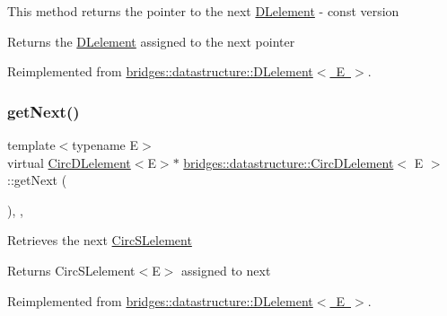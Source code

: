 This method returns the pointer to the next \mbox{\hyperlink{classbridges_1_1datastructure_1_1_d_lelement}{D\+Lelement}} -\/ const version \begin{DoxyReturn}{Returns}
the \mbox{\hyperlink{classbridges_1_1datastructure_1_1_d_lelement}{D\+Lelement}} assigned to the next pointer 
\end{DoxyReturn}


Reimplemented from \mbox{\hyperlink{classbridges_1_1datastructure_1_1_d_lelement_a8599e5be5fc1771d4e8a40f6de67b4a7}{bridges\+::datastructure\+::\+D\+Lelement$<$ E $>$}}.

\mbox{\label{classbridges_1_1datastructure_1_1_circ_d_lelement_a80681d0382643a6df21da1bec4067004}} 
\subsubsection{\texorpdfstring{get\+Next()}{getNext()}\hspace{0.1cm}{\footnotesize\ttfamily [2/2]}}
{\footnotesize\ttfamily template$<$typename E$>$ \\
virtual \mbox{\hyperlink{classbridges_1_1datastructure_1_1_circ_d_lelement}{Circ\+D\+Lelement}}$<$E$>$$\ast$ \mbox{\hyperlink{classbridges_1_1datastructure_1_1_circ_d_lelement}{bridges\+::datastructure\+::\+Circ\+D\+Lelement}}$<$ E $>$\+::get\+Next (\begin{DoxyParamCaption}{ }\end{DoxyParamCaption})\hspace{0.3cm}{\ttfamily [inline]}, {\ttfamily [override]}, {\ttfamily [virtual]}}

Retrieves the next \mbox{\hyperlink{classbridges_1_1datastructure_1_1_circ_s_lelement}{Circ\+S\+Lelement}} \begin{DoxyReturn}{Returns}
Circ\+S\+Lelement$<$\+E$>$ assigned to next 
\end{DoxyReturn}


Reimplemented from \mbox{\hyperlink{classbridges_1_1datastructure_1_1_d_lelement_a63212051ea77d74bd751dea00288d2be}{bridges\+::datastructure\+::\+D\+Lelement$<$ E $>$}}.

\mbox{\label{classbridges_1_1datastructure_1_1_circ_d_lelement_a7176c3ca8347d8d9324a86265c7d6f84}} 
